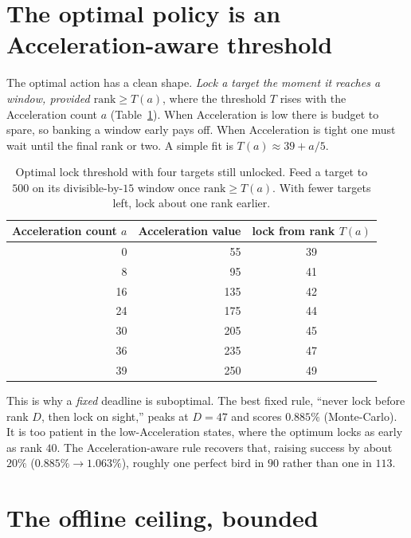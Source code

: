 \documentclass[11pt]{article}
\theoremstyle{remark}
\begin{document}
\section{The optimal policy is an Acceleration-aware threshold}\label{sec:policy}

The optimal action has a clean shape. \emph{Lock a target the moment it reaches a
window, provided $\text{rank}\ge T(a)$}, where the threshold $T$ rises with the
Acceleration count $a$ (Table~\ref{tab:thresh}). When Acceleration is low there is
budget to spare, so banking a window early pays off. When Acceleration is tight one
must wait until the final rank or two. A simple fit is $T(a)\approx 39+a/5$.

\begin{table}[h]
\centering
\begin{tabular}{@{}rrc@{}}
\toprule
Acceleration count $a$ & Acceleration value & lock from rank $T(a)$ \\
\midrule
0  & 55  & 39 \\
8  & 95  & 41 \\
16 & 135 & 42 \\
24 & 175 & 44 \\
30 & 205 & 45 \\
36 & 235 & 47 \\
39 & 250 & 49 \\
\bottomrule
\end{tabular}
\caption{Optimal lock threshold with four targets still unlocked. Feed a target to
$500$ on its divisible-by-$15$ window once $\text{rank}\ge T(a)$. With fewer targets
left, lock about one rank earlier.}
\label{tab:thresh}
\end{table}

This is why a \emph{fixed} deadline is suboptimal. The best fixed rule, ``never lock
before rank $D$, then lock on sight,'' peaks at $D=47$ and scores $0.885\%$
(Monte-Carlo). It is too patient in the low-Acceleration states, where the optimum
locks as early as rank $40$. The Acceleration-aware rule recovers that, raising
success by about $20\%$ ($0.885\%\to 1.063\%$), roughly one perfect bird in $90$
rather than one in $113$.

\section{The offline ceiling, bounded}\label{sec:ceiling}
\end{document}
